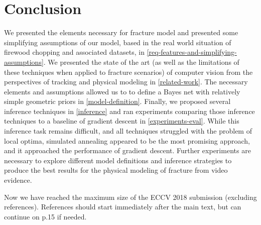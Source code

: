 \documentclass[runningheads]{llncs}
\begin{document}
\section{Conclusion}

We presented the elements necessary for fracture model and presented some 
simplifying assumptions of our model, based in the real world situation of 
firewood chopping and associated datasets, in 
\ref{req-features-and-simplifying-assumptions}. We presented the state of the 
art (as well as the limitations of these techniques when applied to fracture 
scenarios) of computer vision from the perspectives of tracking and physical 
modeling in \ref{related-work}.
The necessary elements and assumptions allowed us to to define a 
Bayes net with relatively simple geometric priors in \ref{model-definition}. 
Finally, we proposed several inference techniques in \ref{inference} and ran experiments comparing 
those inference techniques to a baseline of gradient descent in \ref{experiments-eval}. 
While this inference task remains difficult, and all 
techniques struggled with the problem of local optima, simulated annealing 
appeared to be the most promising approach, and it approached the performance 
of gradient descent. Further experiments are necessary to explore different 
model definitions and inference strategies to produce the best results for the 
physical modeling of fracture from video evidence.
\par\vfill\par
Now we have reached the maximum size of the ECCV 2018 submission (excluding references).
References should start immediately after the main text, but can continue on p.15 if needed.

\clearpage



\end{document}
